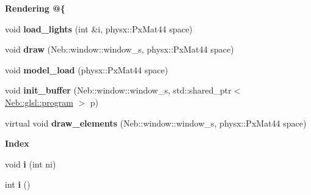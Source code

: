 \begin{Indent}{\bf \-Rendering @\{}\par
\begin{DoxyCompactItemize}
\item 
\hypertarget{classNeb_1_1Shape_1_1shape_ad1ab9b88edbd6fd0e03591ff75036abb}{void {\bfseries load\-\_\-lights} (int \&i, physx\-::\-Px\-Mat44 space)}\label{classNeb_1_1Shape_1_1shape_ad1ab9b88edbd6fd0e03591ff75036abb}

\item 
\hypertarget{classNeb_1_1Shape_1_1shape_ab5ac6ec5c373da456f7c3d72b51c691f}{void {\bfseries draw} (\-Neb\-::window\-::window\-\_\-s, physx\-::\-Px\-Mat44 space)}\label{classNeb_1_1Shape_1_1shape_ab5ac6ec5c373da456f7c3d72b51c691f}

\item 
\hypertarget{classNeb_1_1Shape_1_1shape_a5fa42d964935d426ba7b0f1aa95cfc6a}{void {\bfseries model\-\_\-load} (physx\-::\-Px\-Mat44 space)}\label{classNeb_1_1Shape_1_1shape_a5fa42d964935d426ba7b0f1aa95cfc6a}

\item 
\hypertarget{classNeb_1_1Shape_1_1shape_a8df9182a4079c3a05e8df6f9f4b32676}{void {\bfseries init\-\_\-buffer} (\-Neb\-::window\-::window\-\_\-s, std\-::shared\-\_\-ptr$<$ \hyperlink{classNeb_1_1glsl_1_1program}{\-Neb\-::glsl\-::program} $>$ p)}\label{classNeb_1_1Shape_1_1shape_a8df9182a4079c3a05e8df6f9f4b32676}

\item 
\hypertarget{classNeb_1_1Shape_1_1shape_aaf7bb44f2cc26a0e151ed9993a240c07}{virtual void {\bfseries draw\-\_\-elements} (\-Neb\-::window\-::window\-\_\-s, physx\-::\-Px\-Mat44 space)}\label{classNeb_1_1Shape_1_1shape_aaf7bb44f2cc26a0e151ed9993a240c07}

\end{DoxyCompactItemize}
\end{Indent}
\begin{Indent}{\bf \-Index}\par
\begin{DoxyCompactItemize}
\item 
\hypertarget{classNeb_1_1Shape_1_1shape_a45d9147fdf8c2a76abbefa7b1c00c506}{void {\bfseries i} (int ni)}\label{classNeb_1_1Shape_1_1shape_a45d9147fdf8c2a76abbefa7b1c00c506}

\item 
\hypertarget{classNeb_1_1Shape_1_1shape_a31fe7d23c1f300a3b84ddb10852cc348}{int {\bfseries i} ()}\label{classNeb_1_1Shape_1_1shape_a31fe7d23c1f300a3b84ddb10852cc348}

\end{DoxyCompactItemize}
\end{Indent}
